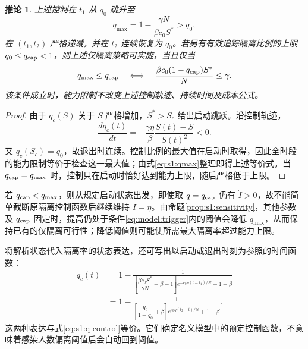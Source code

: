 \documentclass[lang=cn,a4paper,newtx]{elegantpaper}
\numberwithin{equation}{section}
\theoremstyle{plain}
\newtheorem{corollaryn}[theorem]{推论}
\begin{document}
\begin{corollaryn}
\label{cor:s1:qc-structure}
上述控制在 $t_1$ 从 $q_0$ 跳升至
\begin{equation}
q_{\max}=1-\frac{\gamma N}{\beta c_0S^*}>q_0,
\label{eq:s1:qmax}
\end{equation}
在 $(t_1,t_2)$ 严格递减，并在 $t_2$ 连续恢复为 $q_0$。若另有有效追踪隔离比例的上限 $q_0\le q_{\rm cap}<1$，则上述仅隔离策略可实施，当且仅当
\[
q_{\max}\le q_{\rm cap}
\quad\Longleftrightarrow\quad
\frac{\beta c_0(1-q_{\rm cap})S^*}{N}\le\gamma.
\]
该条件成立时，能力限制不改变上述控制轨迹、持续时间及成本公式。
\end{corollaryn}
\begin{proof}
由于 $q_c(S)$ 关于 $S$ 严格增加，$S^*>S_c$ 给出启动跳跃。沿控制轨迹，
\begin{equation}
\frac{dq_c(t)}{dt}=-\frac{\gamma\eta}{\beta}
\frac{S(t)-\bar S}{S(t)^2}<0.
\label{eq:s1:qprime}
\end{equation}
又 $q_c(S_c)=q_0$，故退出时连续。控制比例的最大值在启动时取得，因此全时段的能力限制等价于检查这一最大值；由式\eqref{eq:s1:qmax}整理即得上述等价式。当 $q_{\rm cap}=q_{\max}$ 时，控制只在启动时恰好达到能力上限，随后严格低于上限。
\end{proof}
若 $q_{\rm cap}<q_{\max}$，则从规定启动状态出发，即使取 $q=q_{\rm cap}$ 仍有 $\dot I>0$，故不能简单截断原隔离控制函数后继续维持 $I=\eta$。由命题\ref{prop:s1:sensitivity}，其他参数及 $q_{\rm cap}$ 固定时，提高仍处于条件\eqref{eq:model:trigger}内的阈值会降低 $q_{\max}$，从而保持已有的仅隔离可行性；降低阈值则可能使所需最大隔离率超过能力上限。

将解析状态代入隔离率的状态表达，还可写出以启动或退出时刻为参照的时间函数：
\begin{equation}
\begin{split}
q_c(t)
&=1-\frac{1}{\left[\dfrac{\beta c_0S^*}{\gamma N}+\beta-1\right]
 e^{-c_0\eta(t-t_1)/N}+1-\beta}\\
&=1-\frac{1}{\left[\dfrac{q_0}{1-q_0}+\beta\right]
 e^{c_0\eta(t_2-t)/N}+1-\beta}.
\end{split}
\label{eq:s1:q-time-explicit}
\end{equation}
这两种表达与式\eqref{eq:s1:q-control}等价。它们确定名义模型中的预定控制函数，不意味着感染人数偏离阈值后会自动回到阈值。
\end{document}
